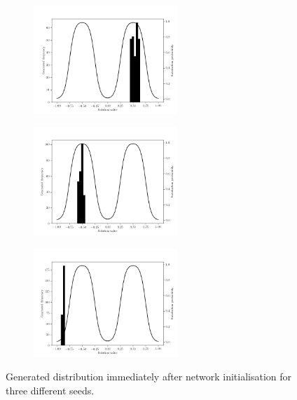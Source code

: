 \documentclass[../../main.tex]{subfiles}
\begin{document}
\begin{figure}
    \centering
    \begin{subfigure}[a]{1.\textwidth}
        \centering
        \includegraphics[width=0.6\textwidth]{initialisedGenerator1}
    \end{subfigure}
    \begin{subfigure}[a]{1.\textwidth}
        \centering
        \includegraphics[width=0.6\textwidth]{initialisedGenerator2}
    \end{subfigure}
    \begin{subfigure}[a]{1.\textwidth}
        \centering
        \includegraphics[width=0.6\textwidth]{initialisedGenerator3}
    \end{subfigure}
    \caption{
        Generated distribution immediately after network initialisation for three different seeds.
    }
\label{fig:initialisedGenerator}
\end{figure}
\end{document}
